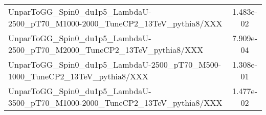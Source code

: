 \begin{landscape}
\begin{table}[!htbp]
\begin{tabular}{lc}
       UnparToGG\_Spin0\_du1p5\_LambdaU-2500\_pT70\_M1000-2000\_TuneCP2\_13TeV\_pythia8/XXX & 1.483e-02\\
       UnparToGG\_Spin0\_du1p5\_LambdaU-2500\_pT70\_M2000\_TuneCP2\_13TeV\_pythia8/XXX & 7.909e-04\\
       UnparToGG\_Spin0\_du1p5\_LambdaU-2500\_pT70\_M500-1000\_TuneCP2\_13TeV\_pythia8/XXX & 1.308e-01\\
       UnparToGG\_Spin0\_du1p5\_LambdaU-3500\_pT70\_M1000-2000\_TuneCP2\_13TeV\_pythia8/XXX & 1.477e-02\\
       \hline \hline
       \end{tabular}
       \label{table:Unpar_signal_samples_xsec}
\end{table}
\end{landscape}


